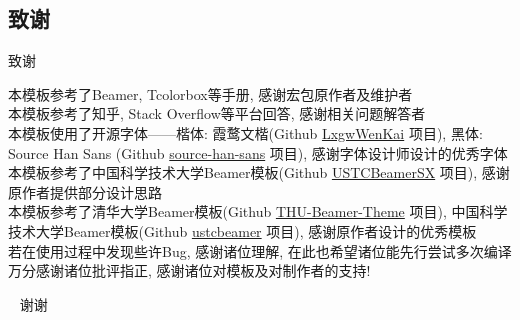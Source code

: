\documentclass[hyperref,UTF8,11pt,CJK]{beamer}
\begin{document}
\subsection{致谢}
\begin{frame}{致谢}
	\begin{center}
		本模板参考了Beamer, Tcolorbox等手册, 感谢宏包原作者及维护者\\[1ex]
		本模板参考了知乎, Stack Overflow等平台回答, 感谢相关问题解答者\\[1ex]
		本模板使用了开源字体——楷体: 霞鹜文楷(Github \href{https://github.com/lxgw/LxgwWenKai/}{\color{BSblue}LxgwWenKai} 项目), 黑体: Source Han Sans (Github \href{https://github.com/adobe-fonts/source-han-sans/}{\color{BSblue}source-han-sans} 项目), 感谢字体设计师设计的优秀字体\\[1ex]
		本模板参考了中国科学技术大学Beamer模板(Github \href{https://github.com/ysx2000/USTCBeamerSX/}{\color{BSblue}USTCBeamerSX} 项目), 感谢原作者提供部分设计思路\\[1ex]
		本模板参考了清华大学Beamer模板(Github \href{https://github.com/tuna/THU-Beamer-Theme/}{\color{BSblue}THU-Beamer-Theme} 项目), 中国科学技术大学Beamer模板(Github \href{https://github.com/ustctug/ustcbeamer/}{\color{BSblue}ustcbeamer} 项目), 感谢原作者设计的优秀模板\\[1ex]
		
		若在使用过程中发现些许Bug, 感谢诸位理解, 在此也希望诸位能先行尝试多次编译\\[1ex]
		万分感谢诸位批评指正, 感谢诸位对模板及对制作者的支持!
	\end{center}
\end{frame}

\begin{frame}{~}
	\centering
	\Huge 谢谢
\end{frame}
\end{document}
